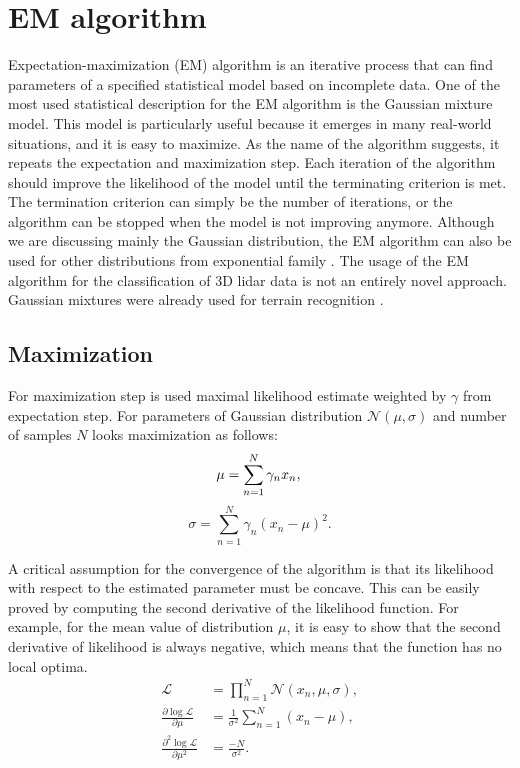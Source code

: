 \section{EM algorithm}
Expectation-maximization (EM) algorithm is an iterative process that can find parameters of a specified statistical model based on incomplete data. One of the most used statistical description for the EM algorithm is the Gaussian mixture model. This model is particularly useful because it emerges in many real-world situations, and it is easy to maximize. As the name of the algorithm suggests, it repeats the expectation and maximization step. Each iteration of the algorithm should improve the likelihood of the model until the terminating criterion is met. The termination criterion can simply be the number of iterations, or the algorithm can be stopped when the model is not improving anymore. Although we are discussing mainly the Gaussian distribution, the EM algorithm can also be used for other distributions from exponential family \cite{dempster1977}. The usage of the EM algorithm for the classification of 3D lidar data is not an entirely novel approach. Gaussian mixtures were already used for terrain recognition \cite{lalonde2006}.
 
\subsection{Maximization}
For maximization step is used maximal likelihood estimate weighted by $\gamma$ from expectation step. For parameters of Gaussian distribution $\mathcal{N}(\mu, \sigma)$ and number of samples $N$ looks maximization as follows:
\begin{equation}
\mu = \sum_{n = 1}^{N} \gamma_n x_n, \\
\end{equation}
\begin{equation}
\sigma = \sum_{n = 1}^{N}\gamma_n (x_n - \mu)^2 .
\end{equation}

A critical assumption for the convergence of the algorithm is that its likelihood with respect to the estimated parameter must be concave. This can be easily proved by computing the second derivative of the likelihood function. For example, for the mean value of distribution  $\mu$, it is easy to show that the second derivative of likelihood is always negative, which means that the function has no local optima.
\begin{align}
\mathcal{L} &= \prod_{n=1}^N \mathcal{N}(x_n, \mu, \sigma), \nonumber \\
\frac{\partial \log \mathcal{L}}{\partial \mu} &= \frac{1}{\sigma^2} \sum_{n = 1}^{N} (x_n - \mu), \\
\frac{\partial^2 \log \mathcal{L}}{\partial \mu^2} &= \frac{-N}{\sigma^2}. \nonumber
\end{align}

